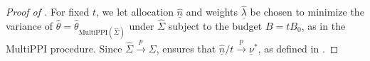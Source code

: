 \documentclass[10pt,a4paper]{amsart}
\newcommand{\ul}[1]{\underline{#1}}
\newcommand{\wh}[1]{\widehat{#1}}
\begin{document}
\begin{proof}[Proof of ]




For fixed $t$, we let allocation $\underline{\hat{n}}$ and weights $\underline{\hat{\lambda}}$ be chosen to minimize the variance of  $\hat{\theta} = \hat{\theta}_{\text{MultiPPI}(\widehat{\Sigma})}$ under $\widehat{\Sigma}$ subject to the budget $B = tB_0$, as in the MultiPPI procedure. Since $\wh{\Sigma}\overset{p}{\to}\Sigma$,  ensures that $\ul{\hat{n}}/t\overset{p}{\to}\ul{\nu}^*$, as defined in .


\end{proof}
\end{document}
